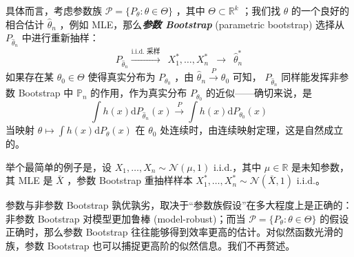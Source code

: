 具体而言，考虑参数族 $\mathscr P=\{P_\theta:\theta\in\Theta\}$ ，其中 $\Theta\subset\mathbb R^k$ ；我们找 $\theta$ 的一个良好的相合估计 $\widehat\theta_n$ ，例如 MLE，那么\textbf{\emph{参数 Bootstrap }} (parametric bootstrap) 选择从 $P_{\widehat\theta_n}$ 中进行重新抽样：
\[P_{\widehat\theta_n}\overset{\text{i.i.d. 采样}}\longrightarrow \enspace X_1^*,\dots,X_n^*\enspace\longrightarrow \enspace \widehat\theta_n^*\]
如果存在某 $\theta_0\in\Theta$ 使得真实分布为 $P_{\theta_0}$ ，由 $\widehat\theta_n\overset{P}\to \theta_0$ 可知， $P_{\widehat\theta_n}$ 同样能发挥非参数 Bootstrap 中 $\mathbb P_n$ 的作用，作为真实分布 $P_{\theta_0}$ 的近似------确切来说，是
\[\int h(x)\mathrm{d}P_{\widehat\theta_n}(x)\overset{P}\to \int h(x)\mathrm dP_{\theta_0}(x)\]
当映射 $\textstyle\theta\mapsto \int h(x)\mathrm{d}P_\theta(x)$ 在 $\theta_0$ 处连续时，由连续映射定理，这是自然成立的。

举个最简单的例子是，设 $X_1,\dots,X_n\sim\mathcal N(\mu,1)$ i.i.d.，其中 $\mu\in\mathbb R$ 是未知参数，其 MLE 是 $\bar X$ ，参数 Bootstrap 重抽样样本 $X_1^*,\dots,X_n^*\sim \mathcal N(\bar X,1)$ i.i.d.。

参数与非参数 Bootstrap 孰优孰劣，取决于``参数族假设''在多大程度上是正确的：非参数 Bootstrap 对模型更加鲁棒 (model-robust)；而当 $\mathscr P=\{P_\theta:\theta\in\Theta\}$ 的假设正确时，那么参数 Bootstrap 往往能够得到效率更高的估计。对似然函数光滑的族，参数 Bootstrap 也可以捕捉更高阶的似然信息。我们不再赘述。

